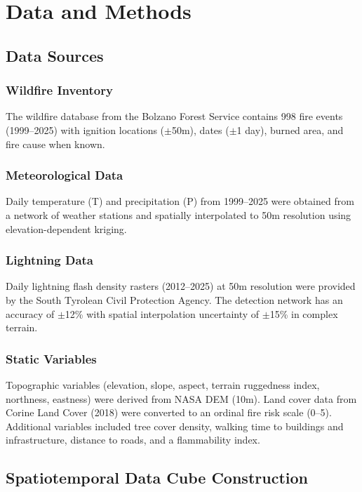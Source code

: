\documentclass[11pt,a4paper]{article}
\begin{document}
\section{Data and Methods}

\subsection{Data Sources}

\subsubsection{Wildfire Inventory}
The wildfire database from the Bolzano Forest Service contains 998 fire events (1999--2025) with ignition locations ($\pm$50m), dates ($\pm$1 day), burned area, and fire cause when known.

\subsubsection{Meteorological Data}
Daily temperature (T) and precipitation (P) from 1999--2025 were obtained from a network of weather stations and spatially interpolated to 50m resolution using elevation-dependent kriging.

\subsubsection{Lightning Data}
Daily lightning flash density rasters (2012--2025) at 50m resolution were provided by the South Tyrolean Civil Protection Agency. The detection network has an accuracy of $\pm$12\% with spatial interpolation uncertainty of $\pm$15\% in complex terrain.

\subsubsection{Static Variables}
Topographic variables (elevation, slope, aspect, terrain ruggedness index, northness, eastness) were derived from NASA DEM (10m). Land cover data from Corine Land Cover (2018) were converted to an ordinal fire risk scale (0--5). Additional variables included tree cover density, walking time to buildings and infrastructure, distance to roads, and a flammability index.

\subsection{Spatiotemporal Data Cube Construction}
\end{document}
